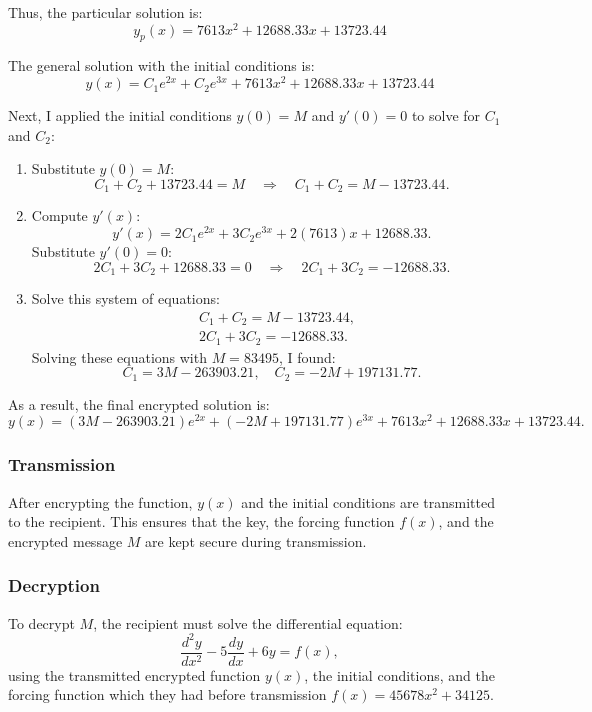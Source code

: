 \documentclass[12pt]{article}
\begin{document}
Thus, the particular solution is:
\[
y_p(x) = 7613x^2 + 12688.33x + 13723.44
\]

The general solution with the initial conditions is:
\[
y(x) = C_1e^{2x} + C_2e^{3x} + 7613x^2 + 12688.33x + 13723.44
\]


Next, I applied the initial conditions \( y(0) = M \) and \( y'(0) = 0 \) to solve for \( C_1 \) and \( C_2 \):
\begin{enumerate}
    \item Substitute \( y(0) = M \):
    \[
    C_1 + C_2 + 13723.44 = M \quad \Rightarrow \quad C_1 + C_2 = M - 13723.44.
    \]

    \item Compute \( y'(x) \):
    \[
    y'(x) = 2C_1e^{2x} + 3C_2e^{3x} + 2(7613)x + 12688.33.
    \]
    Substitute \( y'(0) = 0 \):
    \[
    2C_1 + 3C_2 + 12688.33 = 0 \quad \Rightarrow \quad 2C_1 + 3C_2 = -12688.33.
    \]

    \item Solve this system of equations:
    \[
    \begin{aligned}
        & C_1 + C_2 = M - 13723.44, \\
        & 2C_1 + 3C_2 = -12688.33.
    \end{aligned}
    \]
    Solving these equations with \( M = 83495 \), I found:
    \[
    C_1 = 3M - 263903.21, \quad C_2 = -2M + 197131.77.
    \]
\end{enumerate}

As a result, the final encrypted solution is:
\[
y(x) = (3M - 263903.21)e^{2x} + (-2M + 197131.77)e^{3x} + 7613x^2 + 12688.33x + 13723.44.
\]

\subsubsection*{Transmission}

After encrypting the function, \( y(x) \) and the initial conditions are transmitted to the recipient. This ensures that the key, the forcing function \( f(x) \), and the encrypted message \( M \) are kept secure during transmission.

\subsubsection*{Decryption}

To decrypt \( M \), the recipient must solve the differential equation:
\[
\frac{d^2y}{dx^2} - 5\frac{dy}{dx} + 6y = f(x),
\]
using the transmitted encrypted function \( y(x) \), the initial conditions, and the forcing function which they had before transmission \( f(x) = 45678x^2 + 34125 \).
\end{document}
